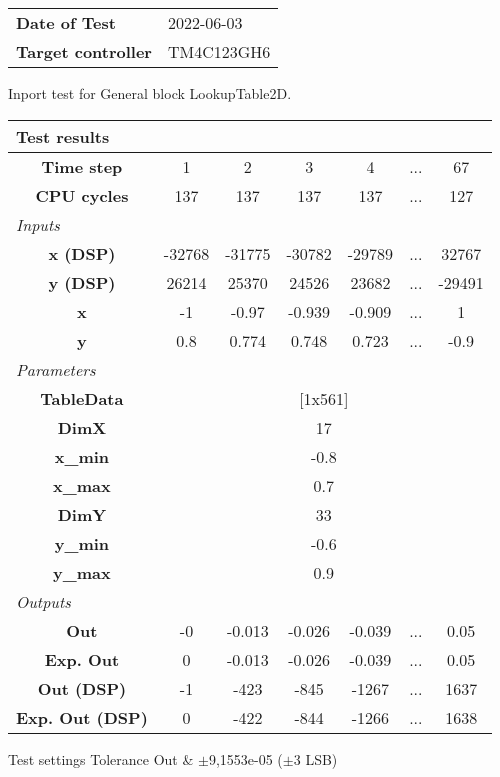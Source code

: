 \begin{tabular}{l l}
\textbf{Date of Test} & 2022-06-03 \tabularnewline
\textbf{Target controller} & TM4C123GH6 \tabularnewline
\end{tabular}
\vspace{1ex}
Inport test for General block LookupTable2D.

\vspace{1em}
\begin{tabularx}{\textwidth}{|c|c|c|c|c|>{\centering\arraybackslash}X|c|}
\hline
\multicolumn{7}{|l|}{\cellcolor[gray]{0.8}\textbf{Test results}} \tabularnewline \hline
\textbf{Time step} & 1 & 2 & 3 & 4 & ... & 67 \tabularnewline \hline
\textbf{CPU cycles} & 137 & 137 & 137 & 137 & ... & 127 \tabularnewline \hline
\multicolumn{7}{|l|}{\cellcolor[gray]{0.9}\textit{Inputs}} \tabularnewline \hline
\textbf{x (DSP)} & -32768 & -31775 & -30782 & -29789 & ... & 32767 \tabularnewline \hline
\textbf{y (DSP)} & 26214 & 25370 & 24526 & 23682 & ... & -29491 \tabularnewline \hline
\textbf{x} & -1 & -0.97 & -0.939 & -0.909 & ... & 1 \tabularnewline \hline
\textbf{y} & 0.8 & 0.774 & 0.748 & 0.723 & ... & -0.9 \tabularnewline \hline
\multicolumn{7}{|l|}{\cellcolor[gray]{0.9}\textit{Parameters}} \tabularnewline \hline
\textbf{TableData} & \multicolumn{6}{c|}{[1x561]} \tabularnewline \hline
\textbf{DimX} & \multicolumn{6}{c|}{17} \tabularnewline \hline
\textbf{x\_min} & \multicolumn{6}{c|}{-0.8} \tabularnewline \hline
\textbf{x\_max} & \multicolumn{6}{c|}{0.7} \tabularnewline \hline
\textbf{DimY} & \multicolumn{6}{c|}{33} \tabularnewline \hline
\textbf{y\_min} & \multicolumn{6}{c|}{-0.6} \tabularnewline \hline
\textbf{y\_max} & \multicolumn{6}{c|}{0.9} \tabularnewline \hline
\multicolumn{7}{|l|}{\cellcolor[gray]{0.9}\textit{Outputs}} \tabularnewline \hline
\textbf{Out} & -0 & -0.013 & -0.026 & -0.039 & ... & 0.05 \tabularnewline \hline
\textbf{Exp. Out} & 0 & -0.013 & -0.026 & -0.039 & ... & 0.05 \tabularnewline \hline
\textbf{Out (DSP)} & -1 & -423 & -845 & -1267 & ... & 1637 \tabularnewline \hline
\textbf{Exp. Out (DSP)} & 0 & -422 & -844 & -1266 & ... & 1638 \tabularnewline \hline
\end{tabularx}
\vspace{1ex}

\begin{XtoCtabular}{Test settings}
Tolerance Out & $\pm$9,1553e-05 ($\pm$3 LSB) \tabularnewline \hline
\end{XtoCtabular}

